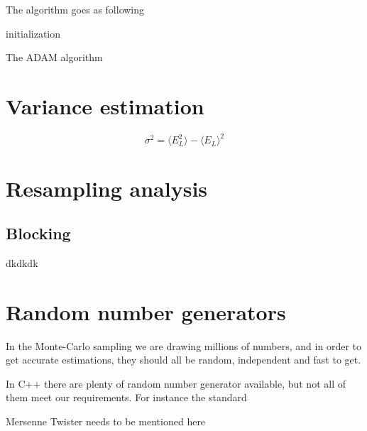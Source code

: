 The algorithm goes as following

\begin{algorithm}[H]
\SetAlgoLined
{}
initialization\;
\caption{The ADAM algorithm}
\end{algorithm}

\section{Variance estimation}
\begin{equation}
\sigma^2=\langle E_L^2\rangle - \langle E_L\rangle^2
\end{equation}

\section{Resampling analysis} \label{sec:resampling}
\subsection{Blocking}
dkdkdk



\section{Random number generators} \label{sec:RNG}
In the Monte-Carlo sampling we are drawing millions of numbers, and in order to get accurate estimations, they should all be random, independent and fast to get. 

In C++ there are plenty of random number generator available, but not all of them meet our requirements. For instance the standard 

Mersenne Twister needs to be mentioned here